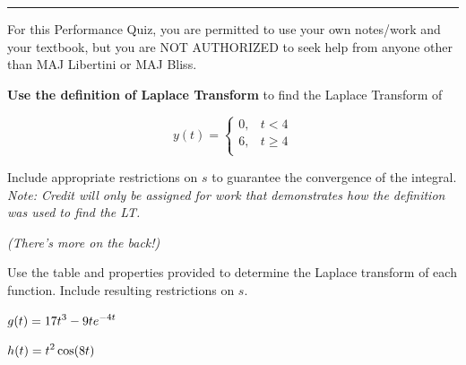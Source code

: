 \noindent\rule{7in}{0.4pt}
\vspace{0.5cm}

\noindent  For this Performance Quiz, you are permitted to use your own notes/work and your
textbook, but you are NOT AUTHORIZED to seek help from anyone
other than MAJ Libertini or MAJ Bliss.\\

\begin{PQ}
\item   {\bf Use the definition of Laplace Transform} to find the Laplace Transform of

  \[y(t) = \left\{ \begin{array}{ll} 0, & t<4\\
        6, & t \ge 4\\
       \end{array} \right.\]    %

  Include appropriate restrictions on $s$ to guarantee the convergence of the integral.\\

  {\it Note:  Credit will only be assigned for work that demonstrates how the definition was
  used to find the LT.}\\
\vfill
\begin{center}{\it (There's more on the back!)}
\end{center}
\newpage
\item  Use the table and properties provided to determine the Laplace transform of each function.
Include resulting restrictions on $s.$
 \ben[label=(\alph*)]
 \item  $\displaystyle g(t) = 17t^3 - 9te^{-4t}$\\ \vfill
 \item  $\displaystyle h(t) = t^2 \cos(8t)$\\ \vfill
 \een
\end{PQ}
